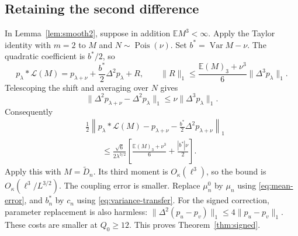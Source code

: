 \documentclass[11pt]{article}
\newcommand{\E}{\mathbb E}
\newcommand{\Var}{\operatorname{Var}}
\newcommand{\Pois}{\operatorname{Pois}}
\newcommand{\Law}{\mathcal L}
\theoremstyle{remark}
\begin{document}
\subsection{Retaining the second difference}
In Lemma~\ref{lem:smooth2}, suppose in addition $\E M^3<\infty$. Apply the Taylor identity with $m=2$ to $M$ and $N\sim\Pois(\nu)$. Set $b^*=\Var M-\nu$. The quadratic coefficient is $b^*/2$, so
\[
 p_\lambda*\Law(M)=p_{\lambda+\nu}+\frac{b^*}{2}\Delta^2p_\lambda+R,
 \qquad
 \|R\|_1\le\frac{\E(M)_3+\nu^3}{6}\|\Delta^3p_\lambda\|_1.
\]
Telescoping the shift and averaging over $N$ gives
\[
 \|\Delta^2p_{\lambda+\nu}-\Delta^2p_\lambda\|_1
 \le\nu\|\Delta^3p_\lambda\|_1.
\]
Consequently
\begin{equation}\label{eq:smooth3}
\begin{split}
 &\frac12\left\|p_\lambda*\Law(M)-p_{\lambda+\nu}
 -\frac{b^*}{2}\Delta^2p_{\lambda+\nu}\right\|_1\\
 &\qquad\le\frac{\sqrt6}{2\lambda^{3/2}}
 \left[\frac{\E(M)_3+\nu^3}{6}+\frac{|b^*|\nu}{2}\right].
\end{split}
\end{equation}
Apply this with $M=\widetilde D_n$. Its third moment is $O_\kappa(\ell^3)$, so the bound is $O_\kappa(\ell^3/L^{3/2})$. The coupling error is smaller. Replace $\mu_n^0$ by $\mu_n$ using \eqref{eq:mean-error}, and $b_n^*$ by $c_n$ using \eqref{eq:variance-transfer}. For the signed correction, parameter replacement is also harmless: $\|\Delta^2(p_u-p_v)\|_1\le4\|p_u-p_v\|_1$. These costs are smaller at $Q_0\ge12$. This proves Theorem~\ref{thm:signed}.
\end{document}
